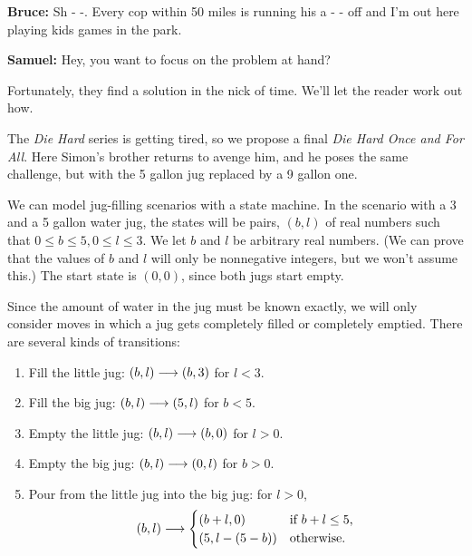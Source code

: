 \begin{example}
{\begin{list}{}{\itemsep=0in \leftmargin=0.25in \rightmargin=0.25in}
\item[\textbf{Bruce:}] Sh - -.  Every cop within 50 miles is running his a - - off
and I'm out here playing kids games in the park.

\item[\textbf{Samuel:}] Hey, you want to focus on the problem at hand?

\end{list}
}

Fortunately, they find a solution in the nick of time.  We'll let the
reader work out how.

The \emph{Die Hard} series is getting tired, so we propose a final
\emph{Die Hard Once and For All}.  Here Simon's brother returns to avenge
him, and he poses the same challenge, but with the 5 gallon jug replaced
by a 9 gallon one.

We can model jug-filling scenarios with a state machine.  In the scenario
with a 3 and a 5 gallon water jug, the states will be pairs, $(b,l)$ of
real numbers such that $0 \leq b \leq 5, 0 \leq l \leq 3$.  We let $b$ and
$l$ be arbitrary real numbers.  (We can prove that the values of $b$ and
$l$ will only be nonnegative integers, but we won't assume this.)  The
start state is $(0,0)$, since both jugs start empty.

Since the amount of water in the jug must be known exactly, we will only
consider moves in which a jug gets completely filled or completely
emptied.  There are several kinds of transitions:
\begin{enumerate}

\item  Fill the little jug: $(b,l) \mathrel{\longrightarrow} (b,3)$ for $l < 3$.

\item  Fill the big jug: $(b,l) \mathrel{\longrightarrow} (5,l)$ for $b<5$.

\item  Empty the little jug: $(b,l) \mathrel{\longrightarrow} (b,0)$ for $l>0$.

\item  Empty the big jug: $(b,l) \mathrel{\longrightarrow} (0,l)$ for $b>0$.

\item  Pour from the little jug into the big jug: for $l>0$,
\begin{equation*}
(b,l) \mathrel{\longrightarrow}
\begin{cases}
(b+l, 0) & \text{if $b + l \le 5$,}\\
(5, l - (5 - b)) & \text{otherwise.}
\end{cases}
\end{equation*}


\end{enumerate}
\end{example}
